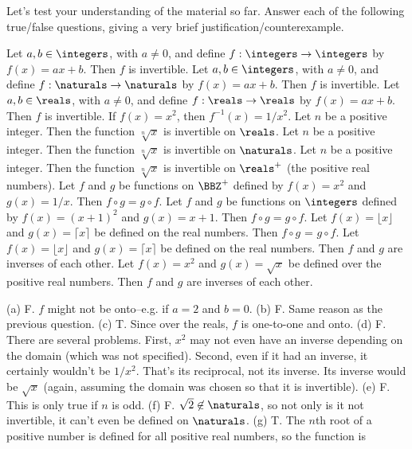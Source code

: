 \begin{exer}
Let's test your understanding of the material so far. Answer each of the following
true/false questions, giving a very brief justification/counterexample.
\begin{enumerate}[(a)]
\itemtf
Let $a,b\in\integers$, with $a\neq 0$, and define $f:\integers\to\integers$ by $f(x)=ax+b$.
Then $f$ is invertible.
\bigskip
\itemtf
Let $a,b\in\integers$, with $a\neq 0$, and define $f:\naturals\to\naturals$ by $f(x)=ax+b$.
Then $f$ is invertible.
\bigskip
\itemtf
Let $a,b\in\reals$, with $a\neq 0$, and define $f:\reals\to\reals$ by $f(x)=ax+b$.
Then $f$ is invertible.
\bigskip
\itemtf
If $f(x)=x^2$, then $f^{-1}(x)=1/x^2$.
\bigskip
\itemtf
Let $n$ be a positive integer. Then the function $\sqrt[n]{x}$ is invertible on $\reals$.
\bigskip
\itemtf
Let $n$ be a positive integer. Then the function $\sqrt[n]{x}$ is invertible on $\naturals$.
\bigskip
\itemtf
Let $n$ be a positive integer. Then the function $\sqrt[n]{x}$ is invertible on $\reals^{+}$ 
(the positive real numbers).
\bigskip
\itemtf
Let $f$ and $g$ be functions on $\BBZ^+$ defined by $f(x)=x^2$ and $g(x)=1/x$.
Then $f\circ g = g\circ f$.
\bigskip
\itemtf
Let $f$ and $g$ be functions on $\integers$ defined by $f(x)=(x+1)^2$ and $g(x)=x+1$.
Then $f\circ g = g\circ f$.
\bigskip
\itemtf
Let $f(x)=\lfloor x\rfloor$ and $g(x)=\lceil x \rceil$ be defined on the real numbers.
Then $f\circ g$ = $g\circ f$.
\bigskip
\itemtf
Let $f(x)=\lfloor x\rfloor$ and $g(x)=\lceil x \rceil$ be defined on the real numbers.
Then $f$ and $g$ are inverses of each other.
\bigskip
\itemtf
Let $f(x)=x^2$ and $g(x)=\sqrt{x}$ be defined over the positive real numbers.  Then $f$ and $g$ are
inverses of each other.
\end{enumerate}
\vspace*{.25in}
\begin{answer}
(a) F.  $f$ might not be onto--e.g. if $a=2$ and $b=0$.
(b) F. Same reason as the previous question.
(c) T. Since over the reals, $f$ is one-to-one and onto.
(d) F. There are several problems.  First, $x^2$ may not even have an inverse depending on 
the domain (which was not specified).  Second, even if it had an inverse, it certainly wouldn't
be $1/x^2$.  That's its reciprocal, not its inverse.  Its inverse would be $\sqrt{x}$ (again,
assuming the domain was chosen so that it is invertible).
(e) F.  This is only true if $n$ is odd.
(f) F.  $\sqrt{2}\not\in\naturals$, so not only is it not invertible, it can't even be defined on $\naturals$.
(g) T.  The $n$th root of a positive number is defined for all positive real numbers, so the function is

\end{answer}
\end{exer}
